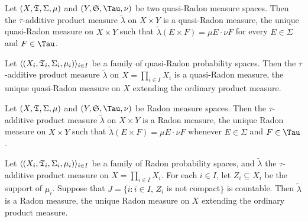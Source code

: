  Let $(X,\frak T,\Sigma,\mu)$ and
$(Y,\frak S,\Tau,\nu)$ be two quasi-Radon measure spaces.   Then the
$\tau$-additive product measure $\tilde\lambda$ on $X\times Y$ is a
quasi-Radon
measure, the unique quasi-Radon measure on $X\times Y$ such that
$\tilde\lambda(E\times F)=\mu E\cdot\nu F$ for every $E\in\Sigma$ and
$F\in\Tau$.


 Let
$\langle (X_i,\frak T_i,\Sigma_i,\mu_i)\rangle_{i\in I}$ be a family of
quasi-Radon
probability spaces.   Then the $\tau$-additive product measure
$\tilde\lambda$ on $X=\prod_{i\in I}X_i$ is a quasi-Radon measure, the
unique quasi-Radon measure on $X$ extending the ordinary product
measure.


 Let $(X,\frak T,\Sigma,\mu)$ and
$(Y,\frak S,\Tau,\nu)$ be Radon measure spaces.   Then the
$\tau$-additive product
measure $\tilde\lambda$ on $X\times Y$ is a Radon measure, the unique
Radon measure on $X\times Y$ such that
$\tilde\lambda(E\times F)=\mu E\cdot\nu F$ whenever $E\in\Sigma$ and
$F\in\Tau$.


 Let
$\langle(X_i,\frak T_i,\Sigma_i,\mu_i)\rangle_{i\in I}$ be a family of
Radon probability
spaces, and $\tilde\lambda$ the $\tau$-additive product measure on
$X=\prod_{i\in I}X_i$.   For each $i\in I$, let
$Z_i\subseteq X_i$ be the support of $\mu_i$.   Suppose that
$J=\{i:i\in I,\,Z_i$ is not compact$\}$ is countable.   Then
$\tilde\lambda$ is a
Radon measure, the unique Radon measure on $X$ extending the ordinary
product measure.

